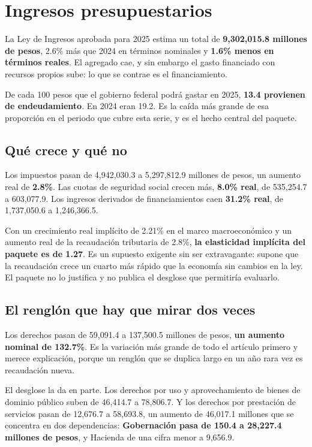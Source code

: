 \chapter{Ingresos presupuestarios}

La Ley de Ingresos aprobada para 2025 estima un total de \textbf{9,302,015.8
millones de pesos}, 2.6\% más que 2024 en términos nominales y \textbf{1.6\% menos
en términos reales}. El agregado cae, y sin embargo el gasto financiado con
recursos propios sube: lo que se contrae es el financiamiento.

De cada 100 pesos que el gobierno federal podrá gastar en 2025, \textbf{13.4
provienen de endeudamiento}. En 2024 eran 19.2. Es la caída más grande de esa
proporción en el periodo que cubre esta serie, y es el hecho central del paquete.



\section{Qué crece y qué no}

Los impuestos pasan de 4,942,030.3 a 5,297,812.9 millones de pesos, un aumento
real de \textbf{2.8\%}. Las cuotas de seguridad social crecen más, \textbf{8.0\%
real}, de 535,254.7 a 603,077.9. Los ingresos derivados de financiamientos caen
\textbf{31.2\% real}, de 1,737,050.6 a 1,246,366.5.

Con un crecimiento real implícito de 2.21\% en el marco macroeconómico y un
aumento real de la recaudación tributaria de 2.8\%, \textbf{la elasticidad
implícita del paquete es de 1.27}. Es un supuesto exigente sin ser extravagante:
supone que la recaudación crece un cuarto más rápido que la economía sin cambios
en la ley. El paquete no lo justifica y no publica el desglose que permitiría
evaluarlo.

\section{El renglón que hay que mirar dos veces}

Los derechos pasan de 59,091.4 a 137,500.5 millones de pesos, \textbf{un aumento
nominal de 132.7\%}. Es la variación más grande de todo el artículo primero y
merece explicación, porque un renglón que se duplica largo en un año rara vez es
recaudación nueva.

El desglose la da en parte. Los derechos por uso y aprovechamiento de bienes de
dominio público suben de 46,414.7 a 78,806.7. Y los derechos por prestación de
servicios pasan de 12,676.7 a 58,693.8, un aumento de 46,017.1 millones que se
concentra en dos dependencias: \textbf{Gobernación pasa de 150.4 a 28,227.4
millones de pesos}, y Hacienda de una cifra menor a 9,656.9.


